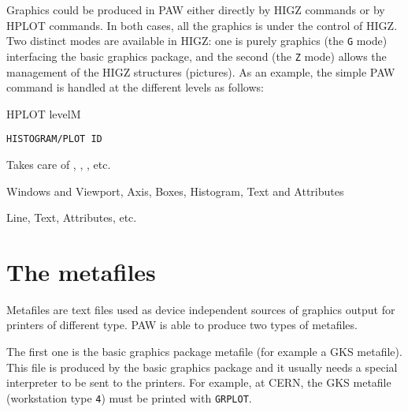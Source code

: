 \newpage

Graphics could be produced in PAW either directly by HIGZ commands or by HPLOT
commands. In both cases, all the graphics is under the control of HIGZ. Two 
distinct modes are available in HIGZ: one is purely graphics (the \texttt{G} mode)
interfacing the basic graphics package, and the second (the \texttt{Z} mode)
allows the management of the HIGZ structures (pictures). As an example, the 
simple PAW command  is handled at the different levels
as follows:

\begin{DL}{HPLOT levelM}
\item[PAW Level]      \texttt{HISTOGRAM/PLOT ID}
\item[HPLOT Level]    Takes care of , 
                      , , etc.
\item[HIGZ Level]     Windows and Viewport, Axis, Boxes, 
                      Histogram, Text and Attributes
\item[Basic graphics] Line, Text, Attributes, etc.
\end{DL}

\section{The metafiles}

Metafiles are text files used as device independent sources of graphics output
for printers of different type. PAW is able to produce two types of metafiles.
 
The first one is the basic graphics package metafile (for example a GKS
metafile). This file is produced by the basic graphics package and it 
usually needs a special interpreter to be sent to the printers. For example, 
at CERN, the GKS metafile (workstation type \texttt{4}) must be printed with 
\texttt{GRPLOT}.

